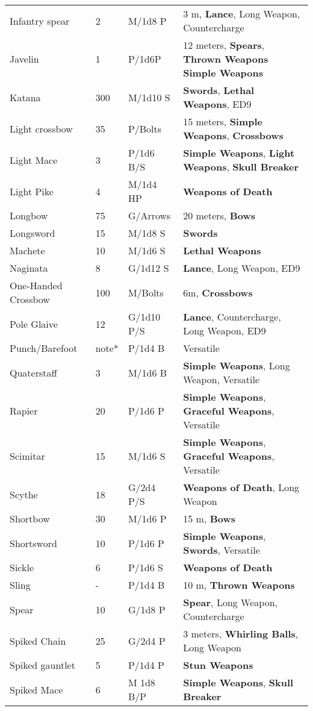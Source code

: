 \documentclass[a4paper,12 pt,openany]{book}
\begin{document}
\begin{textblock*}{19.5cm}
\begin{tabularx}{0.95\textwidth}{llll}
Infantry spear& 2& M/1d8 P&3 m, \textbf{Lance}, Long Weapon, Countercharge\\
Javelin& 1& P/1d6P& 12 meters, \textbf{Spears}, \textbf{Thrown Weapons} \textbf{Simple Weapons}\\
Katana& 300& M/1d10 S& \textbf{Swords}, \textbf{Lethal Weapons}, ED9\\
Light crossbow& 35 & P/Bolts& 15 meters, \textbf{Simple Weapons}, \textbf{Crossbows}\\
Light Mace& 3& P/1d6 B/S& \textbf{Simple Weapons}, \textbf{Light Weapons}, \textbf{Skull Breaker}\\
Light Pike& 4& M/1d4 HP&\textbf{Weapons of Death}\\
Longbow& 75 & G/Arrows& 20 meters, \textbf{Bows}\\
Longsword& 15 & M/1d8 S&\textbf{Swords}\\
Machete& 10 & M/1d6 S&\textbf{Lethal Weapons}\\
Naginata& 8& G/1d12 S&\textbf{Lance}, Long Weapon, ED9\\
One-Handed Crossbow& 100& M/Bolts& 6m, \textbf{Crossbows}\\
Pole Glaive& 12 & G/1d10 P/S& \textbf{Lance}, Countercharge, Long Weapon, ED9\\
Punch/Barefoot& note*& P/1d4 B&Versatile\\
Quaterstaff& 3& M/1d6 B& \textbf{Simple Weapons}, Long Weapon, Versatile\\
Rapier& 20 & P/1d6 P& \textbf{Simple Weapons}, \textbf{Graceful Weapons}, Versatile\\
Scimitar& 15 & M/1d6 S&\textbf{Simple Weapons}, \textbf{Graceful Weapons}, Versatile\\
Scythe& 18 & G/2d4 P/S& \textbf{Weapons of Death}, Long Weapon\\
Shortbow& 30 & M/1d6 P& 15 m, \textbf{Bows}\\
Shortsword& 10 & P/1d6 P&\textbf{Simple Weapons}, \textbf{Swords}, Versatile\\
Sickle& 6& P/1d6 S& \textbf{Weapons of Death}\\
Sling& -& P/1d4 B& 10 m, \textbf{Thrown Weapons}\\
Spear& 10 & G/1d8 P&\textbf{Spear}, Long Weapon, Countercharge\\
Spiked Chain& 25 & G/2d4 P& 3 meters, \textbf{Whirling Balls}, Long Weapon\\
Spiked gauntlet& 5& P/1d4 P&\textbf{Stun Weapons}\\
Spiked Mace& 6& M 1d8 B/P& \textbf{Simple Weapons}, \textbf{Skull Breaker}\\

\end{tabularx}
\end{textblock*}
\end{document}

